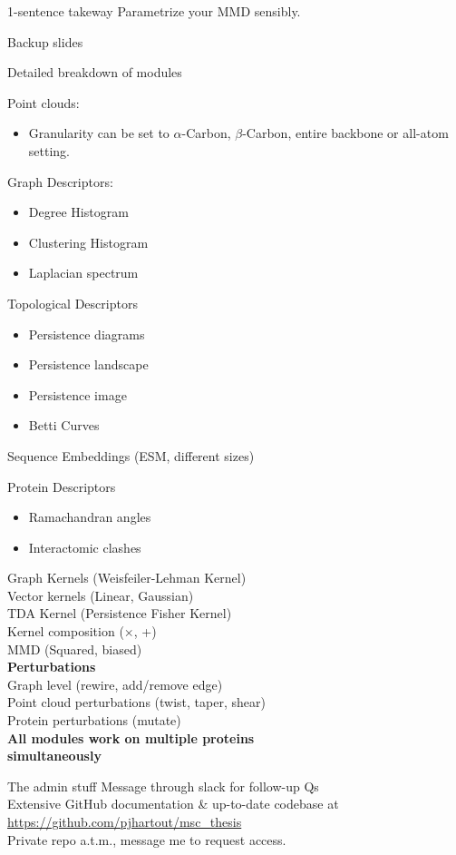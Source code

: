\documentclass[aspectratio=169, 10pt, dvipsnames]{beamer}
\begin{document}
\begin{frame}[standout]{1-sentence takeway}
  Parametrize your MMD sensibly.
\end{frame}

\begin{frame}[standout]
  Backup slides
\end{frame}

\begin{frame}[fragile]{Detailed breakdown of modules}
  \footnotesize{
  \begin{minipage}{.45\textwidth}
    Point clouds:
    \begin{itemize}
    \item Granularity can be set to $\alpha$-Carbon, $\beta$-Carbon, entire backbone or all-atom setting.
    \end{itemize}
    Graph Descriptors:
    \begin{itemize}
    \item Degree Histogram
    \item Clustering Histogram
    \item Laplacian spectrum
    \end{itemize}
    Topological Descriptors
    \begin{itemize}
      \item Persistence diagrams
      \item Persistence landscape
      \item Persistence image
      \item Betti Curves
    \end{itemize}
    Sequence Embeddings (ESM, different sizes)
  \end{minipage}
  \hfill
  \begin{minipage}{.45\textwidth}

    Protein Descriptors
      \begin{itemize}
      \item Ramachandran angles
      \item Interactomic clashes
      \end{itemize}
      Graph Kernels (Weisfeiler-Lehman Kernel)\\
      Vector kernels (Linear, Gaussian)\\
      TDA Kernel (Persistence Fisher Kernel)\\
      Kernel composition ($\times$, +)\\
      MMD (Squared, biased)\\
      \newline
      \textbf{Perturbations}\\
      Graph level (rewire, add/remove edge)\\
      Point cloud perturbations (twist, taper, shear)\\
      Protein perturbations (mutate)\\
      \textbf{All modules work on multiple proteins \\simultaneously}
  \end{minipage}
}
\end{frame}

\begin{frame}[fragile]{The admin stuff}
  Message through slack for follow-up Qs\\
  Extensive GitHub documentation \& up-to-date codebase at \\ \faGithub{}
  \url{https://github.com/pjhartout/msc_thesis}\\
  Private repo a.t.m., message me to request access.
\end{frame}
\end{document}
